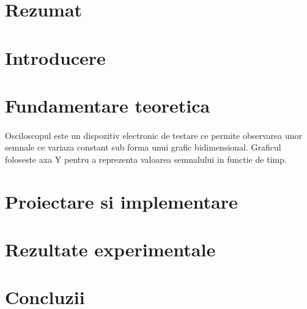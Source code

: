 \documentclass[10pt,a4paper]{article}
\begin{document}




\tableofcontents

\clearpage

\section{Rezumat}

\clearpage

\section{Introducere}

\clearpage

\section{Fundamentare teoretica}
\paragraph{}
Osciloscopul este un dispozitiv electronic de testare ce permite 
observarea unor semnale ce variaza constant sub forma unui grafic bidimensional.
Graficul foloseste axa Y pentru a reprezenta valoarea semnalului in functie de timp.


\clearpage

\section{Proiectare si implementare}

\clearpage



\clearpage

\section{Rezultate experimentale}
\clearpage

\section{Concluzii}
\end{document}
